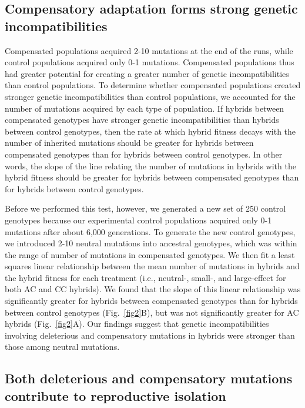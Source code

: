 \documentclass[11pt]{article}
\begin{document}
\subsection*{Compensatory adaptation forms strong genetic incompatibilities}

Compensated populations acquired 2-10 mutations at the end of the runs,
while control populations acquired only 0-1 mutations.
%
Compensated populations thus had greater potential for creating
a greater number of genetic incompatibilities than control populations.
%
To determine whether compensated populations created stronger
genetic incompatibilities than control populations,
we accounted for the number of mutations acquired by each type of population.
%
If hybrids between compensated genotypes
have stronger genetic incompatibilities
than hybrids between control genotypes,
then the rate at which hybrid fitness decays
with the number of inherited mutations
should be greater for hybrids between compensated genotypes
than for hybrids between control genotypes.
%
In other words, the slope of the line relating
the number of mutations in hybrids
with the hybrid fitness should be greater
for hybrids between compensated genotypes
than for hybrids between control genotypes.



Before we performed this test, however,
we generated a new set of 250 control genotypes
because our experimental control populations
acquired only 0-1 mutations after about 6,000 generations.
%
To generate the new control genotypes,
we introduced 2-10 neutral mutations into ancestral genotypes,
which was within the range of number of mutations in compensated genotypes.
%
We then fit a least squares linear relationship between
the mean number of mutations in hybrids
and the hybrid fitness for each treatment
(i.e., neutral-, small-, and large-effect for both AC and CC hybrids).
%
We found that the slope of this linear relationship
was significantly greater for hybrids between compensated genotypes
than for hybrids between control genotypes (Fig.~\ref{fig2}B),
but was not significantly greater for AC hybrids (Fig.~\ref{fig2}A).
%
Our findings suggest that genetic incompatibilities
involving deleterious and compensatory mutations in hybrids
were stronger than those among neutral mutations.



\subsection*{Both deleterious and compensatory mutations
  contribute to reproductive isolation}
\end{document}
